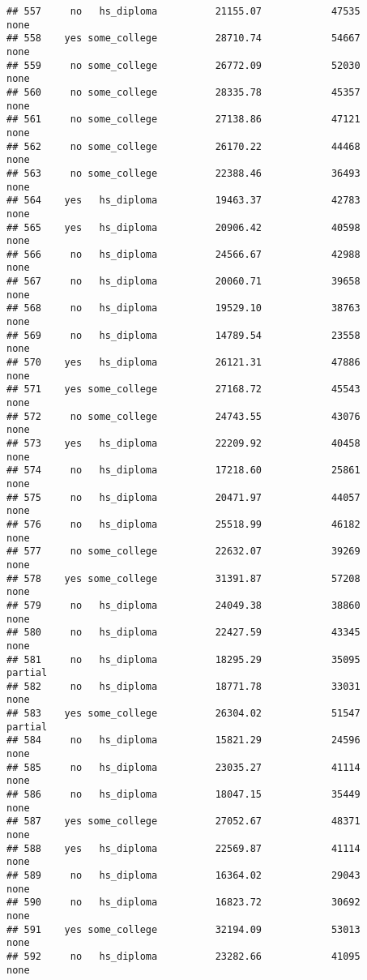 \documentclass[
]{article}
\begin{document}
\begin{verbatim}
## 557     no   hs_diploma          21155.07            47535        none
## 558    yes some_college          28710.74            54667        none
## 559     no some_college          26772.09            52030        none
## 560     no some_college          28335.78            45357        none
## 561     no some_college          27138.86            47121        none
## 562     no some_college          26170.22            44468        none
## 563     no some_college          22388.46            36493        none
## 564    yes   hs_diploma          19463.37            42783        none
## 565    yes   hs_diploma          20906.42            40598        none
## 566     no   hs_diploma          24566.67            42988        none
## 567     no   hs_diploma          20060.71            39658        none
## 568     no   hs_diploma          19529.10            38763        none
## 569     no   hs_diploma          14789.54            23558        none
## 570    yes   hs_diploma          26121.31            47886        none
## 571    yes some_college          27168.72            45543        none
## 572     no some_college          24743.55            43076        none
## 573    yes   hs_diploma          22209.92            40458        none
## 574     no   hs_diploma          17218.60            25861        none
## 575     no   hs_diploma          20471.97            44057        none
## 576     no   hs_diploma          25518.99            46182        none
## 577     no some_college          22632.07            39269        none
## 578    yes some_college          31391.87            57208        none
## 579     no   hs_diploma          24049.38            38860        none
## 580     no   hs_diploma          22427.59            43345        none
## 581     no   hs_diploma          18295.29            35095     partial
## 582     no   hs_diploma          18771.78            33031        none
## 583    yes some_college          26304.02            51547     partial
## 584     no   hs_diploma          15821.29            24596        none
## 585     no   hs_diploma          23035.27            41114        none
## 586     no   hs_diploma          18047.15            35449        none
## 587    yes some_college          27052.67            48371        none
## 588    yes   hs_diploma          22569.87            41114        none
## 589     no   hs_diploma          16364.02            29043        none
## 590     no   hs_diploma          16823.72            30692        none
## 591    yes some_college          32194.09            53013        none
## 592     no   hs_diploma          23282.66            41095        none

\end{verbatim}
\end{document}
